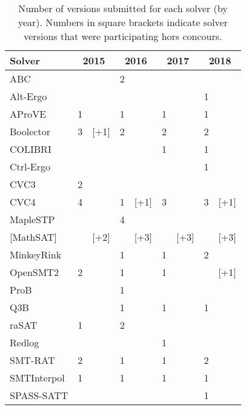 \documentclass[twoside,11pt]{article}
\begin{document}
\begin{table}
  \caption{Number of versions submitted for each solver (by year).
    Numbers in square brackets indicate solver versions that were
    participating hors concours.}
  \label{table:participants-history}
  \centering
  \begin{tabular}{|l|r@{\,\,}r|r@{\,\,}r|r@{\,\,}r|r@{\,\,}r|}
    \hline
    Solver & \multicolumn{2}{c|}{2015} & \multicolumn{2}{c|}{2016} & \multicolumn{2}{c|}{2017} & \multicolumn{2}{c|}{2018} \\
    \hline
    ABC               &    &      &  2 &      &    &      &    &      \\
    Alt-Ergo          &    &      &    &      &    &      &  1 &      \\
    AProVE            &  1 &      &  1 &      &  1 &      &  1 &      \\
    Boolector         &  3 & [+1] &  2 &      &  2 &      &  2 &      \\
    COLIBRI           &    &      &    &      &  1 &      &  1 &      \\
    Ctrl-Ergo         &    &      &    &      &    &      &  1 &      \\
    CVC3              &  2 &      &    &      &    &      &    &      \\
    CVC4              &  4 &      &  1 & [+1] &  3 &      &  3 & [+1] \\
    MapleSTP          &    &      &  4 &      &    &      &    &      \\
    {[}MathSAT{]}     &    & [+2] &    & [+3] &    & [+3] &    & [+3] \\
    MinkeyRink        &    &      &  1 &      &  1 &      &  2 &      \\
    OpenSMT2          &  2 &      &  1 &      &  1 &      &    & [+1] \\
    ProB              &    &      &  1 &      &    &      &    &      \\
    Q3B               &    &      &  1 &      &  1 &      &  1 &      \\
    raSAT             &  1 &      &  2 &      &    &      &    &      \\
    Redlog            &    &      &    &      &  1 &      &    &      \\
    SMT-RAT           &  2 &      &  1 &      &  1 &      &  2 &      \\
    SMTInterpol       &  1 &      &  1 &      &  1 &      &  1 &      \\
    SPASS-SATT        &    &      &    &      &    &      &  1 &      \\

\end{tabular}
\end{table}
\end{document}
